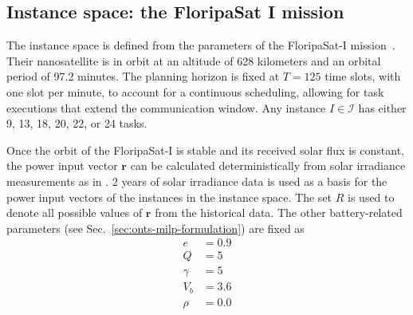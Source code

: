 \subsection{Instance space: the FloripaSat I mission}\label{sec:instance-space}

The instance space is defined from the parameters of the FloripaSat-I mission~\cite{marcelinoCriticalEmbeddedSystem2020}.
Their nanosatellite is in orbit at an altitude of 628 kilometers and an orbital period of 97.2 minutes.
The planning horizon is fixed at $T=125$ time slots, with one slot per minute, to account for a continuous scheduling, allowing for task executions that extend the communication window.
Any instance $I\in \mathcal{I}$ has either 9, 13, 18, 20, 22, or 24 tasks.

Once the orbit of the FloripaSat-I is stable and its received solar flux is constant, the power input vector $\bm{r}$ can be calculated deterministically from solar irradiance measurements as in .
2 years of solar irradiance data is used as a basis for the power input vectors of the instances in the instance space.
The set $R$ is used to denote all possible values of $\bm{r}$ from the historical data.
The other battery-related parameters (see Sec.~\ref{sec:onts-milp-formulation}) are fixed as 
\begin{align*}
    e &= 0.9 \\
    Q &= 5 \\
    \gamma &= 5 \\
    V_b &= 3.6 \\
    \rho &= 0.0
\end{align*}

